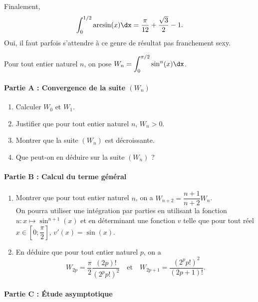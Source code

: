 \documentclass[11pt,fleqn, openany]{book} %
\begin{document}
\begin{solution}
\begin{enumerate}
Finalement,
\[\displaystyle\int_0^{1/2} \arcsin(x) \dx = \dfrac{\pi}{12}+\dfrac{\sqrt{3}}{2}-1.\]
Oui, il faut parfois s'attendre à ce genre de résultat pas franchement sexy.

\end{enumerate}
\newpage
\end{solution}




\begin{exercise}[topic=trig03, subtitle={(Intégrales de Wallis)}]

Pour tout entier naturel $n$, on pose $W_n = \displaystyle\int_0^{\pi/2} \sin^n(x) \dx$.

\paragraph{Partie A : Convergence de la suite $(W_n)$}

\begin{enumerate}
\item Calculer $W_0$ et $W_1$.
\item Justifier que pour tout entier naturel $n$, $W_n >0$.
\item Montrer que la suite $(W_n)$ est décroissante. 
\item Que peut-on en déduire sur la suite $(W_n)$ ?
\end{enumerate}

\paragraph{Partie B : Calcul du terme général}

\begin{enumerate}
\item Montrer que pour tout entier naturel $n$, on a $W_{n+2}=\dfrac{n+1}{n+2}W_n$. \\
On pourra utiliser une intégration par parties en utilisant la fonction $u :x \mapsto \sin^{n+1}(x)$ et en déterminant une fonction $v$ telle que pour tout réel $x\in\left[0;\dfrac{\pi}{2}\right]$, $v'(x)=\sin(x)$.
\item En déduire que pour tout entier naturel $p$, on a
\[W_{2p}=\dfrac{\pi}{2}\dfrac{(2p)!}{(2^pp!)^2}\quad \text{et}\quad W_{2p+1}=\dfrac{(2^pp!)^2}{(2p+1)!}.\]
\end{enumerate}

\paragraph{Partie C : Étude asymptotique}


\end{exercise}
\end{document}
